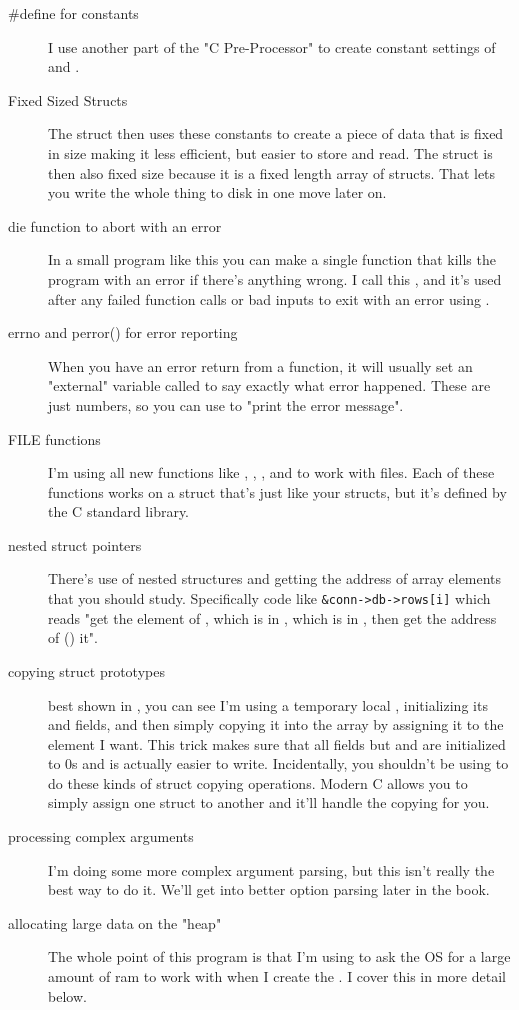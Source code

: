 \begin{description}
\item [\#define for constants] I use another part of the "C Pre-Processor" to
    create constant settings of  and .
\item [Fixed Sized Structs] The  struct then uses these
    constants to create a piece of data that is fixed in size making it
    less efficient, but easier to store and read.  The  struct
    is then also fixed size because it is a fixed length array of 
    structs.  That lets you write the whole thing to disk in one move later on.
\item [die function to abort with an error] In a small program like this you
    can make a single function that kills the program with an error if there's
    anything wrong.  I call this , and it's used after any failed
    function calls or bad inputs to exit with an error using .
\item [errno and perror() for error reporting] When you have an error return
    from a function, it will usually set an "external" variable called 
    to say exactly what error happened.  These are just numbers, so you can use
     to "print the error message".
\item [FILE functions] I'm using all new functions like , ,
    , and  to work with files.  Each of these functions
    works on a  struct that's just like your structs, but it's defined
    by the C standard library.
\item [nested struct pointers] There's use of nested structures and getting the
    address of array elements that you should study.  Specifically code like
    \verb|&conn->db->rows[i]| which reads "get the  element of , which is
    in , which is in , then get the address of (\ident{\&}) it".
\item [copying struct prototypes] best shown in , you can
    see I'm using a temporary local , initializing its 
    and  fields, and then simply copying it into the  array by
    assigning it to the element I want.  This trick makes sure that all fields
    but  and  are initialized to 0s and is actually 
    easier to write.  Incidentally, you shouldn't be using  to do
    these kinds of struct copying operations. Modern C allows you to simply assign
    one struct to another and it'll handle the copying for you.
\item [processing complex arguments] I'm doing some more complex argument parsing,
    but this isn't really the best way to do it.  We'll get into better option
    parsing later in the book.
\item [allocating large data on the "heap"] The whole point of this program is
    that I'm using  to ask the OS for a large amount of ram
    to work with when I create the .  I cover this in more
    detail below.
\end{description}


